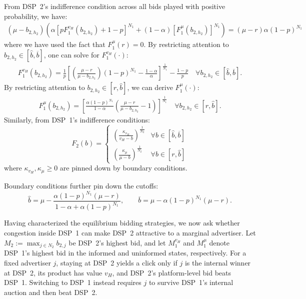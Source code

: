 \noindent From DSP~2's indifference condition across all bids played with positive probability, we have:
\begin{align*}
    \left(\mu - b_{2, h_2} \right) \left( \alpha \left[pF_1^{v_H}(b_{2,h_2}) + 1-p \right]^{N_1} + (1-\alpha) \left[F_1^{\mu}(b_{2,h_2})\right]^{N_1} \right) = \left(\mu-r\right)\alpha (1-p)^{N_1}
\end{align*}
where we have used the fact that $F_1^{\mu}(r)=0$. By restricting attention to $b_{2,h_{2}}\in [\hat{b},\overline{b}]$, one can solve for $F_1^{v_H}(\cdot)$:
\begin{align*}
    F_1^{v_H}(b_{2,h_2}) =  \frac{1}{p} \left[ \left( \frac{\mu-r}{\mu - b_{2, h_2}}\right) (1-p)^{N_1} - \frac{1-\alpha}{\alpha}\right]^{\frac{1}{N_1}} - \frac{1-p}{p} \quad \forall b_{2,h_2} \in [\hat{b},\overline{b}].
\end{align*}
By restricting attention to $b_{2,h_{2}}\in [r,\hat{b}]$, we can derive $F_1^{\mu}(\cdot)$:
\begin{align*}
    F_1^{\mu}(b_{2,h_2}) = \left[ \frac{\alpha (1-p)^{N_1}}{1-\alpha} \left( \frac{\mu-r}{\mu - b_{2, h_2}}-1\right)\right]^{\frac{1}{N_1}} \quad \forall b_{2,h_2} \in [r,\hat{b}].
\end{align*}
Similarly, from DSP~1's indifference conditions:
\begin{equation*}
F_2(b) = \begin{cases}
    \left(\frac{\kappa_{v_H}}{v_H-b}\right)^{\frac{1}{N_2}} & \forall b \in [\hat{b}, \overline{b}] \\[5pt]
    \left(\frac{\kappa_{\mu}}{\mu-b}\right)^{\frac{1}{N_2}} & \forall b \in [r, \hat{b}]
\end{cases}
\end{equation*}
where $\kappa_{v_H}, \kappa_{\mu} \geq 0$ are pinned down by boundary conditions.

\noindent Boundary conditions further pin down the cutoffs:
\begin{equation*}
    \hat{b} = \mu - \frac{\alpha(1-p)^{N_1}(\mu-r)}{1-\alpha + \alpha(1-p)^{N_1}}, \qquad
    \overline{b} = \mu - \alpha(1-p)^{N_1}(\mu-r).
\end{equation*}

\noindent Having characterized the equilibrium bidding strategies, we now ask whether congestion inside DSP~1 can make DSP~2 attractive to a marginal advertiser. Let $M_2 := \max_{j \in N_2} b_{2,j}$ be DSP~2's highest bid, and let $M_1^{v_H}$ and $M_1^{\mu}$ denote DSP~1's highest bid in the informed and uninformed states, respectively. For a fixed advertiser $j$, staying at DSP~2 yields a click only if $j$ is the internal winner at DSP~2, its product has value $v_H$, and DSP~2's platform-level bid beats DSP~1. Switching to DSP~1 instead requires $j$ to survive DSP~1's internal auction and then beat DSP~2.

